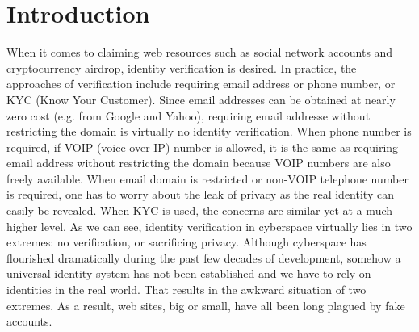 \documentclass[12pt, a4paper]{article}
\begin{document}
\newpage

\tableofcontents

\newpage

\section{Introduction}

When it comes to claiming web resources such as social network accounts and cryptocurrency airdrop, identity verification is desired. In practice, the approaches of verification include requiring email address or phone number, or KYC (Know Your Customer). Since email addresses can be obtained at nearly zero cost (e.g. from Google and Yahoo), requiring email addresse without restricting the domain is virtually no identity verification. When phone number is required, if VOIP (voice-over-IP) number is allowed, it is the same as requiring email address without restricting the domain because VOIP numbers are also freely available. When email domain is restricted or non-VOIP telephone number is required, one has to worry about the leak of privacy as the real identity can easily be revealed. When KYC is used, the concerns are similar yet at a much higher level. As we can see, identity verification in cyberspace virtually lies in two extremes: no verification, or sacrificing privacy. Although cyberspace has flourished dramatically during the past few decades of development, somehow a universal identity system has not been established and we have to rely on identities in the real world. That results in the awkward situation of two extremes. As a result, web sites, big or small, have all been long plagued by fake accounts.
\end{document}
